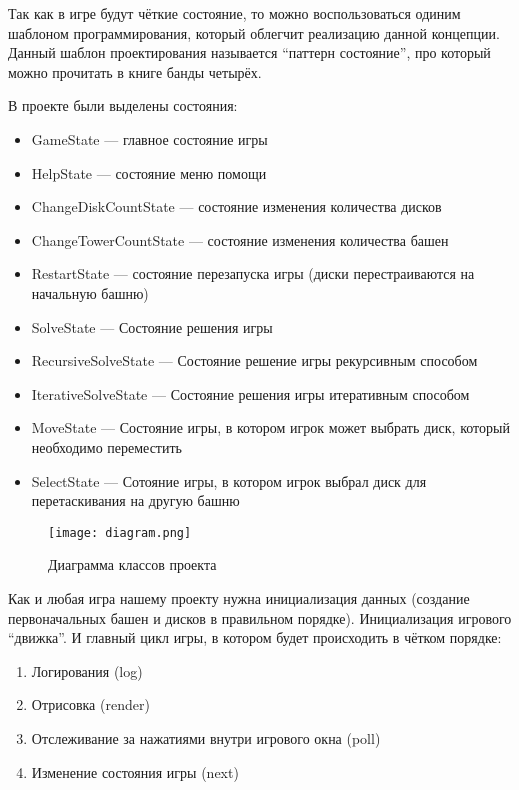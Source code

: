 Так как в игре будут чёткие состояние, то можно воспользоваться одиним шаблоном
программирования, который облегчит реализацию данной концепции. Данный шаблон
проектирования называется ``паттерн состояние'', про который можно прочитать в
книге банды четырёх.\cite{book:2584808}

В проекте были выделены состояния:

\begin{itemize}
	\item GameState --- главное состояние игры
	\item HelpState --- состояние меню помощи
	\item ChangeDiskCountState --- состояние изменения количества дисков
	\item ChangeTowerCountState --- состояние изменения количества башен
	\item RestartState --- состояние перезапуска игры (диски перестраиваются на
	      начальную башню)
	\item SolveState --- Состояние решения игры
  \item RecursiveSolveState --- Состояние решение игры рекурсивным способом
	\item IterativeSolveState --- Состояние решения игры итеративным способом
	\item MoveState --- Состояние игры, в котором игрок может выбрать диск,
	      который необходимо переместить
	\item SelectState --- Сотояние игры, в котором игрок выбрал диск для
	      перетаскивания на другую башню
\end{itemize}

\begin{figure}[H]
	\begin{center}
		\texttt{[image: diagram.png]}
		\caption{Диаграмма классов проекта}
	\end{center}
\end{figure}

Как и любая игра нашему проекту нужна инициализация данных (создание
первоначальных башен и дисков в правильном порядке). Инициализация игрового
``движка''. И главный цикл игры, в котором будет происходить в чётком порядке:

\begin{enumerate}
  \item Логирования (log)
  \item Отрисовка (render)
  \item Отслеживание за нажатиями внутри игрового окна (poll)
  \item Изменение состояния игры (next)
\end{enumerate}

